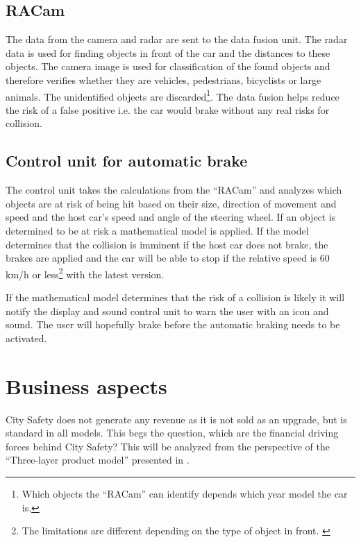 \documentclass[conference]{IEEEtran}
\begin{document}
\subsection{RACam}
The data from the camera and radar are sent to the data fusion unit. The radar data is used for finding objects in front of the car and the distances to these objects. The camera image is used for classification of the found objects and therefore verifies whether they are vehicles, pedestrians, bicyclists or large animals. The unidentified objects are discarded\footnote{Which objects the ``RACam'' can identify depends which year model the car is.}. The data fusion helps reduce the risk of a false positive i.e. the car would brake without any real risks for collision. \cite{SysDescription}

\subsection{Control unit for automatic brake}
The control unit takes the calculations from the ``RACam'' and analyzes which objects are at risk of being hit based on their size, direction of movement and speed and the host car's speed and angle of the steering wheel. If an object is determined to be at risk a mathematical model is applied. If the model determines that the collision is imminent if the host car does not brake, the brakes are applied and the car will be able to stop if the relative speed is 60 km/h or less\footnote{The limitations are different depending on the type of object in front. \cite{CitySafetyDefinition}} with the latest version. \cite{SysDescription, CitySafetyDefinition}

If the mathematical model determines that the risk of a collision is likely it will notify the display and sound control unit to warn the user with an icon and sound. The user will hopefully brake before the automatic braking needs to be activated. \cite{CitySafetyDefinition}

\section{Business aspects}
City Safety does not generate any revenue as it is not sold as an upgrade, but is standard in all models. This begs the question, which are the financial driving forces behind City Safety? This will be analyzed from the perspective of the ``Three-layer product model'' presented in \cite{TeLESM}.
\end{document}
